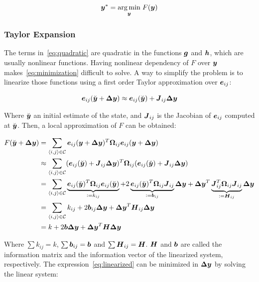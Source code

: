 \begin{equation}
\boldsymbol{y}^* = \underset{\boldsymbol{y}}{\arg\min} \;F(\boldsymbol{y})
\label{eq:minimization}
\end{equation}

\subsubsection{Taylor Expansion}

The terms in~\eqref{eq:quadratic} are quadratic in the functions $\boldsymbol{g}$ and $\boldsymbol{h}$, which are usually nonlinear functions. Having nonlinear dependency of $F$ over $\boldsymbol{y}$ makes~\eqref{eq:minimization} difficult to solve. A way to simplify the problem is to linearize those functions using a first order Taylor approximation over $\boldsymbol{e}_{ij}$:

\begin{equation}
\boldsymbol{e}_{ij}(\breve{\boldsymbol{y}}+\boldsymbol{\Delta y}) \approx \boldsymbol{e}_{ij}(\breve{\boldsymbol{y}}) + \boldsymbol{J}_{ij}\boldsymbol{\Delta y}
\end{equation}

Where $\breve{\boldsymbol{y}}$ an initial estimate of the state, and $\boldsymbol{J}_{ij}$ is the Jacobian of $\boldsymbol{e}_{ij}$ computed at $\breve{\boldsymbol{y}}$. Then, a local approximation of $F$ can be obtained:

\begin{align}
F(\breve{\boldsymbol{y}}+\boldsymbol{\Delta y}) &= \sum_{\left<i,j\right>\in\mathcal{C}}
\boldsymbol{e}_{ij}(\boldsymbol{y}+\boldsymbol{\Delta y})^T\boldsymbol{\Omega}_{ij} 
\boldsymbol{e}_{ij}(\boldsymbol{y}+\boldsymbol{\Delta y}) \notag \\
& \approx \sum_{\left<i,j\right>\in\mathcal{C}} 
(\boldsymbol{e}_{ij}(\breve{\boldsymbol{y}}) + \boldsymbol{J}_{ij}\boldsymbol{\Delta y})^T \boldsymbol{\Omega}_{ij}
(\boldsymbol{e}_{ij}(\breve{\boldsymbol{y}}) + \boldsymbol{J}_{ij}\boldsymbol{\Delta y})\notag \\
&= \sum_{\left<i,j\right>\in\mathcal{C}}
\underbrace{\boldsymbol{e}_{ij}(\breve{\boldsymbol{y}})^T\boldsymbol{\Omega}_{ij}\boldsymbol{e}_{ij}(\breve{\boldsymbol{y}})}_{\vcentcolon= k_{ij}}
+2\underbrace{\boldsymbol{e}_{ij}(\breve{\boldsymbol{y}})^T\boldsymbol{\Omega}_{ij}\boldsymbol{J}_{ij}}_{ \vcentcolon= \boldsymbol{b}_{ij}}\boldsymbol{\Delta y}
+\boldsymbol{\Delta y}^T
\underbrace{\boldsymbol{J}_{ij}^T\boldsymbol{\Omega}_{ij}\boldsymbol{J}_{ij}}_{\vcentcolon= \boldsymbol{H}_{ij}}
\boldsymbol{\Delta y} \notag \\
&= \sum_{\left<i,j\right>\in\mathcal{C}} k_{ij} + 2\boldsymbol{b}_{ij}\boldsymbol{\Delta y} + \boldsymbol{\Delta y}^T \boldsymbol{H}_{ij} \boldsymbol{\Delta y} \notag \\
&= k + 2\boldsymbol{b} \boldsymbol{\Delta y} + \boldsymbol{\Delta y}^T \boldsymbol{H} \boldsymbol{\Delta y}
\label{eq:linearized}
\end{align}

Where $\sum k_{ij} = k$, $\sum \boldsymbol{b}_{ij} = \boldsymbol{b}$ and $\sum \boldsymbol{H}_{ij} = \boldsymbol{H}$. $\boldsymbol{H}$ and $\boldsymbol{b}$ are called the information matrix and the information vector of the linearized system, respectively. The expression~\eqref{eq:linearized} can be minimized in $\boldsymbol{\Delta y}$ by solving the linear system:

